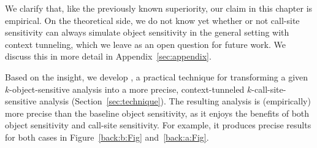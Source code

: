 
We clarify that, like the previously known superiority, our claim in this chapter is empirical. 
On the theoretical side, we do not know yet whether or not call-site sensitivity can always simulate object sensitivity in the general setting with context tunneling, which we leave as an open question for future work. We discuss this in more detail in Appendix~\ref{sec:appendix}.


\myparagraph{\ourtechnique}
Based on the insight, 
we develop \ourtechnique, a practical technique for transforming a given $k$-object-sensitive analysis 
into a more precise, context-tunneled $k$-call-site-sensitive analysis (Section~\ref{sec:technique}).  The
resulting analysis is (empirically) more precise than the baseline
object sensitivity, as it enjoys the benefits of both object
sensitivity and call-site sensitivity. For example, it
produces precise results for both cases in Figure~\ref{back:b:Fig} and~\ref{back:a:Fig}.


